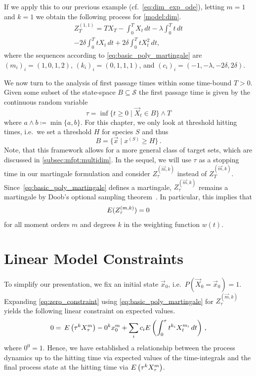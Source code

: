 \begin{example}
If we apply this to our previous example (cf.\ \eqref{eq:dim_exp_ode}), letting $m=1$ %
and $k=1$ we obtain the following process for \autoref{model:dim}.
\begin{multline*}
    Z_T^{(1,1)} = TX_T - \int_0^T X_t\,dt
	- \lambda \int_0^T t\,dt\\ - 2\delta
    \int_0^T t X_t\,dt +
    2{\delta}\int_0^TtX_t^2\,dt,
\end{multline*}
where the sequences according to \eqref{eq:basic_poly_martingale} are $(m_i)_i=(1,0,1,2)$, $(k_i)_i=(0,1,1,1)$,
and $(c_i)_i=(-1,-\lambda, -2\delta,2\delta)$.
\end{example}
We now turn to the analysis of first passage times within some time-bound
$T>0$. Given some subset of the state-space
$B\subseteq \mathcal{S}$ the first passage time is given by the continuous random variable 
\[
	\tau = \inf\{t\geq 0\mid \vec X_t \in B\} \land T
\]
where $a \land b \coloneqq \min\{a, b\}$.
For this chapter, we only look at threshold hitting times,
i.e.\ we set a threshold $H$ for species $S$ and thus 
\[
	B=\{\vec{x}\mid x^{(S)}\geq H\}\,.
\]
Note, that this framework
allows for a more general class of target sets, which are discussed in
\autoref{subsec:mfpt:multidim}.
In the sequel, we will use $\tau$ as a stopping time in our martingale
formulation and consider
$Z_\tau^{(\vec m, k)}$ instead of $Z_T^{(\vec m, k)}$.
Since~\eqref{eq:basic_poly_martingale} defines a martingale, $Z_{\tau}^{(\vec m, k)}$
remains a martingale by
Doob's optional sampling theorem~\parencite{gihmantheory}. In particular, this
implies that 
\begin{equation}\label{eq:zero_constraint}
	{E}(Z_{\tau}^{(m, k)})=0
\end{equation}
for all moment orders $m$ and
degrees $k$ in the weighting function $w(t)$.

\section{Linear Model Constraints}
To simplify our presentation, we fix an initial state $\vec x_0$, i.e.\ $P(\vec X_0=\vec x_0)=1$.
Expanding \eqref{eq:zero_constraint} using
\eqref{eq:basic_poly_martingale} for $Z_{\tau}^{(\vec m, k)}$
yields the following linear constraint on expected values.
\begin{equation}\label{eq:constraint}
    0 = \,{E}\left({\tau}^kX_{\tau}^{m}\right)
        - 0^kx_0^{m}
        + \sum_{i}c_i{E}\left(\int_{0}^{\tau} t^{k_i} X_t^{m_i}\,dt\right)\,,
\end{equation}
where $0^0=1$.
Hence, we have established a relationship between the process dynamics
up to the hitting time via expected values of the time-integrals and the final process state at
the hitting time via ${E}\left(\tau^k {X}_{\tau}^{{m}}\right)$.

